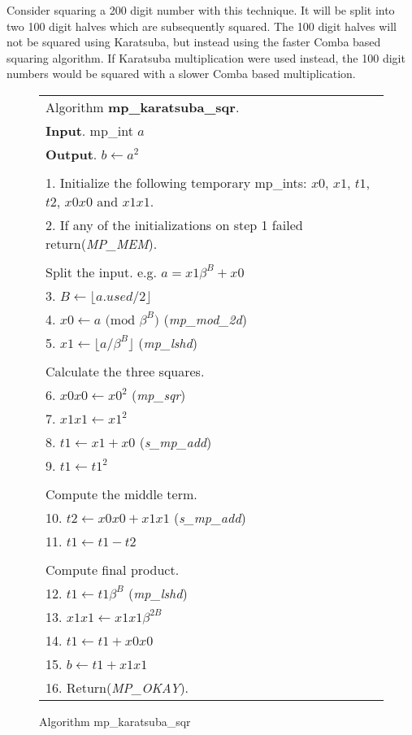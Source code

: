 \documentclass[b5paper]{book}
\begin{document}
Consider squaring a 200 digit number with this technique.  It will be split into two 100 digit halves which are subsequently squared.  
The 100 digit halves will not be squared using Karatsuba, but instead using the faster Comba based squaring algorithm.  If Karatsuba multiplication
were used instead, the 100 digit numbers would be squared with a slower Comba based multiplication.  

\newpage\begin{figure}[!here]
\begin{small}
\begin{center}
\begin{tabular}{l}
\hline Algorithm \textbf{mp\_karatsuba\_sqr}. \\
\textbf{Input}.   mp\_int $a$ \\
\textbf{Output}.  $b \leftarrow a^2$ \\
\hline \\
1.  Initialize the following temporary mp\_ints:  $x0$, $x1$, $t1$, $t2$, $x0x0$ and $x1x1$. \\
2.  If any of the initializations on step 1 failed return(\textit{MP\_MEM}). \\
\\
Split the input.  e.g. $a = x1\beta^B + x0$ \\
3.  $B \leftarrow \lfloor a.used / 2 \rfloor$ \\
4.  $x0 \leftarrow a \mbox{ (mod }\beta^B\mbox{)}$ (\textit{mp\_mod\_2d}) \\
5.  $x1 \leftarrow \lfloor a / \beta^B \rfloor$ (\textit{mp\_lshd}) \\
\\
Calculate the three squares. \\
6.  $x0x0 \leftarrow x0^2$ (\textit{mp\_sqr}) \\
7.  $x1x1 \leftarrow x1^2$ \\
8.  $t1 \leftarrow x1 + x0$ (\textit{s\_mp\_add}) \\
9.  $t1 \leftarrow t1^2$ \\
\\
Compute the middle term. \\
10.  $t2 \leftarrow x0x0 + x1x1$ (\textit{s\_mp\_add}) \\
11.  $t1 \leftarrow t1 - t2$ \\
\\
Compute final product. \\
12.  $t1 \leftarrow t1\beta^B$ (\textit{mp\_lshd}) \\
13.  $x1x1 \leftarrow x1x1\beta^{2B}$ \\
14.  $t1 \leftarrow t1 + x0x0$ \\
15.  $b \leftarrow t1 + x1x1$ \\
16.  Return(\textit{MP\_OKAY}). \\
\hline
\end{tabular}
\end{center}
\end{small}
\caption{Algorithm mp\_karatsuba\_sqr}
\end{figure}
\end{document}
